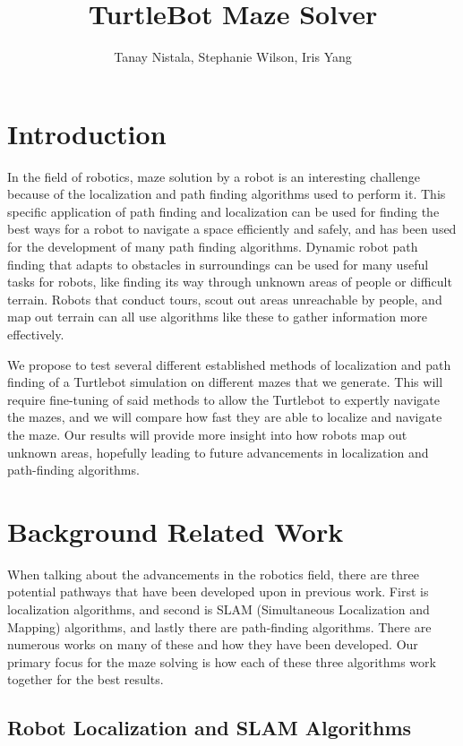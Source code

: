 \documentclass{article}
\title{TurtleBot Maze Solver}
\author{Tanay Nistala, Stephanie Wilson, Iris Yang}
\date{\vspace{-1em}}
\begin{document}
\maketitle


\section{Introduction}


In the field of robotics, maze solution by a robot is an interesting challenge because of the localization and path finding algorithms used to perform it. This specific application of path finding and localization can be used for finding the best ways for a robot to navigate a space efficiently and safely, and has been used for the development of many path finding algorithms. Dynamic robot path finding that adapts to obstacles in surroundings can be used for many useful tasks for robots, like finding its way through unknown areas of people or difficult terrain. Robots that conduct tours, scout out areas unreachable by people, and map out terrain can all use algorithms like these to gather information more effectively. 


We propose to test several different established methods of localization and path finding of a Turtlebot simulation on different mazes that we generate. This will require fine-tuning of said methods to allow the Turtlebot to expertly navigate the mazes, and we will compare how fast they are able to localize and navigate the maze. Our results will provide more insight into how robots map out unknown areas, hopefully leading to future advancements in localization and path-finding algorithms. 



\section{Background Related Work}

When talking about the advancements in the robotics field, there are three potential pathways that have been developed upon in previous work. First is localization algorithms, and second is SLAM (Simultaneous Localization and Mapping) algorithms, and lastly there are path-finding algorithms. There are numerous works on many of these and how they have been developed. Our primary focus for the maze solving is how each of these three algorithms work together for the best results. 

\subsection{Robot Localization and SLAM Algorithms}
\end{document}
